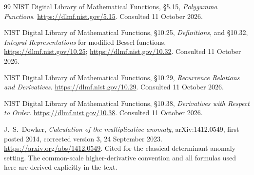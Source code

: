 \documentclass[11pt,letterpaper]{article}
\numberwithin{equation}{section}
\theoremstyle{definition}
\begin{document}
\begin{thebibliography}{99}
NIST Digital Library of Mathematical Functions,
\S5.15, \emph{Polygamma Functions}.
\url{https://dlmf.nist.gov/5.15}. Consulted 11 October 2026.

NIST Digital Library of Mathematical Functions,
\S10.25, \emph{Definitions}, and \S10.32,
\emph{Integral Representations} for modified Bessel functions.
\url{https://dlmf.nist.gov/10.25}; \url{https://dlmf.nist.gov/10.32}.
Consulted 11 October 2026.

NIST Digital Library of Mathematical Functions,
\S10.29, \emph{Recurrence Relations and Derivatives}.
\url{https://dlmf.nist.gov/10.29}. Consulted 11 October 2026.

NIST Digital Library of Mathematical Functions,
\S10.38, \emph{Derivatives with Respect to Order}.
\url{https://dlmf.nist.gov/10.38}. Consulted 11 October 2026.

J.~S.~Dowker, \emph{Calculation of the multiplicative anomaly},
arXiv:1412.0549, first posted 2014, corrected version 3,
24 September 2023.
\url{https://arxiv.org/abs/1412.0549}.
Cited for the classical determinant-anomaly setting. The common-scale
higher-derivative convention and all formulas used here are derived
explicitly in the text.
\end{thebibliography}
\endgroup
\end{document}
